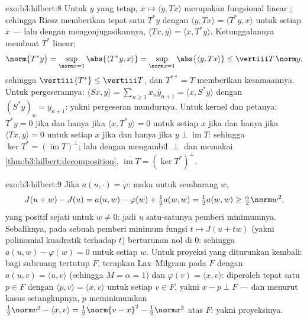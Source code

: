 \begin{solution}{exo:b3:hilbert:8}
Untuk $y$ yang tetap, $x \mapsto \langle y, Tx\rangle$ merupakan
fungsional linear ; sehingga Riesz memberikan tepat satu $T^*y$ dengan
$\langle y, Tx\rangle = \langle T^*y, x\rangle$ untuk setiap $x$
--- lalu dengan mengonjugasikannya, $\langle Tx, y\rangle = \langle x,
T^*y\rangle$. Ketunggalannya membuat $T^*$ linear;
\[
\norm{T^*y} = \sup_{\norm x = 1}\abs{\langle T^*y, x\rangle}
= \sup_{\norm x=1}\abs{\langle y, Tx\rangle}
\leq \vertiii T\,\norm y,
\]
sehingga $\vertiii{T^*} \leq \vertiii T$, dan $T^{**} = T$ memberikan
kesamaannya. Untuk pergeserannya: $\langle Sx, y\rangle = \sum_{n\geq1}
x_n\bar y_{n+1} = \langle x, S^*y\rangle$ dengan $(S^*y)_n =
y_{n+1}$: yakni pergeseran mundurnya. Untuk kernel dan petanya: $T^*y = 0$ jika dan hanya jika
$\langle x, T^*y\rangle = 0$ untuk setiap $x$ jika dan hanya jika $\langle Tx,
y\rangle = 0$ untuk setiap $x$ jika dan hanya jika $y \perp \operatorname{im}T$:
sehingga $\ker T^* = (\operatorname{im}T)^\perp$; lalu dengan mengambil $\perp$ dan
memakai \cref{thm:b3:hilbert:decomposition},
$\overline{\operatorname{im}T} = (\ker T^*)^\perp$.
\end{solution}

\begin{solution}{exo:b3:hilbert:9}
Jika $a(u, \cdot) = \varphi$: maka untuk sembarang $w$,
\[
J(u + w) - J(u) = a(u, w) - \varphi(w) + \tfrac12a(w,w)
= \tfrac12a(w,w) \geq \tfrac\alpha2\norm w^2,
\]
yang positif sejati untuk $w \neq 0$: jadi $u$ satu-satunya pemberi minimumnya.
Sebaliknya, pada sebuah pemberi minimum fungsi $t \mapsto J(u + tw)$
(yakni polinomial kuadratik terhadap $t$) berturunan nol di
$0$: sehingga $a(u, w) - \varphi(w) = 0$ untuk setiap $w$. Untuk proyeksi
yang diturunkan kembali: bagi subruang tertutup $F$, terapkan Lax--Milgram pada
 $F$ dengan $a(u,v) = \langle u, v\rangle$
(sehingga $M = \alpha = 1$) dan $\varphi(v) = \langle x, v\rangle$: diperoleh
tepat satu $p \in F$ dengan $\langle p, v\rangle = \langle x,
v\rangle$ untuk setiap $v \in F$, yakni $x - p \perp F$ --- dan menurut
kasus setangkupnya, $p$ meminimumkan $\frac12\norm v^2 - \langle
x, v\rangle = \frac12\norm{v - x}^2 - \frac12\norm x^2$ atas
$F$: yakni proyeksinya.
\end{solution}

